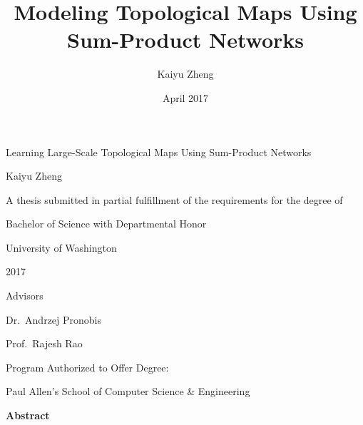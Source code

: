 \documentclass[10pt, titlepage]{article}
\title{Modeling Topological Maps Using Sum-Product Networks}
\author{Kaiyu Zheng}
\date{April 2017}
\theoremstyle{definition}
\begin{document}
\begin{titlepage}
\centering
{}
\vspace*{\fill}
  \huge Learning Large-Scale Topological Maps Using Sum-Product Networks\normalsize

  \vspace{0.5in}

  \Large Kaiyu Zheng\large

  \vspace{2in}

  A thesis submitted in partial fulfillment of the requirements for the degree of

  \vspace{0.1in}

  Bachelor of Science with Departmental Honor

  \vspace{0.8in}
  University of Washington

  2017

  \vspace{0.4in}
  Advisors

  Dr.~Andrzej Pronobis

  Prof.~Rajesh Rao

  \vspace{0.8in}
  Program Authorized to Offer Degree:

  \vspace{0.1in}

  Paul Allen's School of Computer Science \& Engineering\normalsize
\vspace*{\fill}

\end{titlepage}


\newpage
{} %
\begin{center}\Large \textbf{Abstract}\normalsize\end{center}

\newpage
\listoffigures

\newpage
\listoftables

\newpage
\tableofcontents
 
\newpage
{} %
\end{document}
